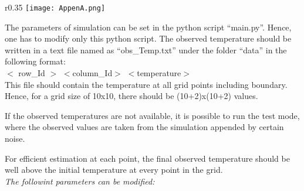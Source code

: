 \documentclass[10pt,a4paper]{report}
\begin{document}
\begin{appendices}
\begin{wrapfigure}{r}{0.35\textwidth} %
    \centering
    \texttt{[image: AppenA.png]}
\end{wrapfigure}

The parameters of simulation can be set in the python script “main.py”. Hence, one has to modify only this python script. The observed temperature should be  written in a text file named as  “obs\_Temp.txt” under the folder “data” in the following format:\\

$<$ row\_Id $>$ \;     $<$column\_Id$>$  \;   $<$temperature$>$\\

This file should contain the temperature at all grid points including boundary. Hence, for a grid size of 10x10, there should be (10+2)x(10+2) values.

If the observed temperatures are not available, it is possible to run the test mode, where the observed values are taken from the simulation appended by certain noise. 

For efficient estimation at each point, the final observed temperature should be well above the initial temperature at every point in the grid. \\


\newpage
\textit{The followint parameters can be modified:}\\





\end{appendices}
\end{document}
